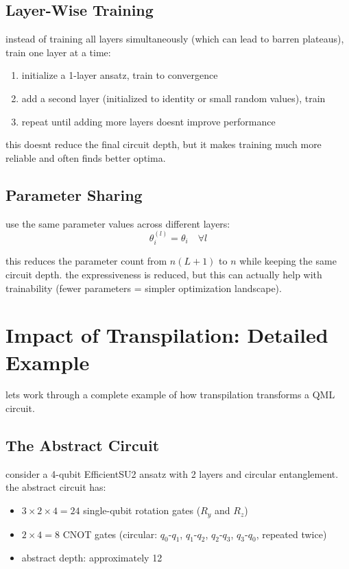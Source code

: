 \documentclass[11pt,a4paper]{article}
\theoremstyle{definition}
\theoremstyle{remark}
\begin{document}
\subsection{Layer-Wise Training}

instead of training all layers simultaneously (which can lead to barren plateaus), train one layer at a time:

\begin{enumerate}[label=\arabic*.]
    \item initialize a 1-layer ansatz, train to convergence
    \item add a second layer (initialized to identity or small random values), train
    \item repeat until adding more layers doesnt improve performance
\end{enumerate}

this doesnt reduce the final circuit depth, but it makes training much more reliable and often finds better optima.

\subsection{Parameter Sharing}

use the same parameter values across different layers:
\[
\theta_i^{(l)} = \theta_i \quad \forall l
\]

this reduces the parameter count from $n(L+1)$ to $n$ while keeping the same circuit depth. the expressiveness is reduced, but this can actually help with trainability (fewer parameters = simpler optimization landscape).

\section{Impact of Transpilation: Detailed Example}

lets work through a complete example of how transpilation transforms a QML circuit.

\subsection{The Abstract Circuit}

consider a 4-qubit EfficientSU2 ansatz with 2 layers and circular entanglement. the abstract circuit has:
\begin{itemize}[leftmargin=*]
    \item $3 \times 2 \times 4 = 24$ single-qubit rotation gates ($R_y$ and $R_z$)
    \item $2 \times 4 = 8$ CNOT gates (circular: $q_0$-$q_1$, $q_1$-$q_2$, $q_2$-$q_3$, $q_3$-$q_0$, repeated twice)
    \item abstract depth: approximately 12
\end{itemize}
\end{document}
